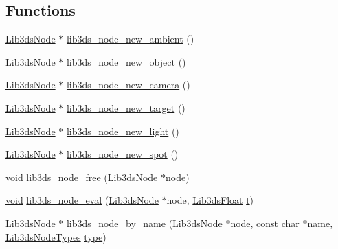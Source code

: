 \subsection*{Functions}
\begin{DoxyCompactItemize}
\item 
\hyperlink{struct_lib3ds_node}{Lib3ds\-Node} $\ast$ \hyperlink{group__node_ga9b077326a489dd365d296f4461d0f2d9}{lib3ds\-\_\-node\-\_\-new\-\_\-ambient} ()
\item 
\hyperlink{struct_lib3ds_node}{Lib3ds\-Node} $\ast$ \hyperlink{group__node_gac682b7f522ac4df18e4520a3986e88df}{lib3ds\-\_\-node\-\_\-new\-\_\-object} ()
\item 
\hyperlink{struct_lib3ds_node}{Lib3ds\-Node} $\ast$ \hyperlink{group__node_ga87ea73d39b7e004d97689b56b61c1f2a}{lib3ds\-\_\-node\-\_\-new\-\_\-camera} ()
\item 
\hyperlink{struct_lib3ds_node}{Lib3ds\-Node} $\ast$ \hyperlink{group__node_gae3d7ea581bfa09412a888efb8addb81f}{lib3ds\-\_\-node\-\_\-new\-\_\-target} ()
\item 
\hyperlink{struct_lib3ds_node}{Lib3ds\-Node} $\ast$ \hyperlink{group__node_ga9a3cfceaf24c0e96cbefbf8a927085d7}{lib3ds\-\_\-node\-\_\-new\-\_\-light} ()
\item 
\hyperlink{struct_lib3ds_node}{Lib3ds\-Node} $\ast$ \hyperlink{group__node_ga5dbc1832e77dad1e9e7283fa4535e082}{lib3ds\-\_\-node\-\_\-new\-\_\-spot} ()
\item 
\hyperlink{group___u_a_v_objects_plugin_ga444cf2ff3f0ecbe028adce838d373f5c}{void} \hyperlink{group__node_gaa1334c0bb54fd1e017a9a90bb35fe7cd}{lib3ds\-\_\-node\-\_\-free} (\hyperlink{struct_lib3ds_node}{Lib3ds\-Node} $\ast$node)
\item 
\hyperlink{group___u_a_v_objects_plugin_ga444cf2ff3f0ecbe028adce838d373f5c}{void} \hyperlink{group__node_ga4acd8cfe942bea19e99176604176fe94}{lib3ds\-\_\-node\-\_\-eval} (\hyperlink{struct_lib3ds_node}{Lib3ds\-Node} $\ast$node, \hyperlink{types_8h_ab18e70f51f9a53c9dee8d930c8e1a7bf}{Lib3ds\-Float} \hyperlink{glext_8h_a00140d6f5c548b26daf170bf16e86a6d}{t})
\item 
\hyperlink{struct_lib3ds_node}{Lib3ds\-Node} $\ast$ \hyperlink{group__node_ga0cc3bd32c789db0ae7a6ccb11e3e9fac}{lib3ds\-\_\-node\-\_\-by\-\_\-name} (\hyperlink{struct_lib3ds_node}{Lib3ds\-Node} $\ast$node, const char $\ast$\hyperlink{glext_8h_ad977737dfc9a274a62741b9500c49a32}{name}, \hyperlink{types_8h_aa6e93328c39112c608d845f4e0c56143}{Lib3ds\-Node\-Types} \hyperlink{glext_8h_a7d05960f4f1c1b11f3177dc963a45d86}{type})
\item 

\end{DoxyCompactItemize}
